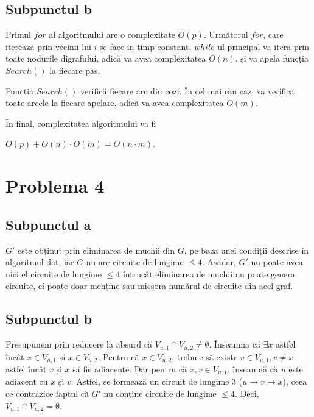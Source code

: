 \documentclass{article}
\begin{document}
\subsection*{\fontsize{16}{30}\selectfont Subpunctul b}
{\fontsize{14}{16}\selectfont
Primul $for$ al algoritmului are o complexitate $O(p)$. Următorul $for$, care itereaza prin vecinii lui $i$ se face in timp constant. $while$-ul principal va itera prin toate nodurile digrafului, adică va avea complexitatea $O(n)$, și va apela funcția $Search()$ la fiecare pas.

Functia $Search()$ verifică fiecare arc din cozi. În cel mai rău caz, va verifica toate arcele la fiecare apelare, adică va avea complexitatea $O(m)$.

În final, complexitatea algoritmului va fi \\
\centerline {$O(p) + O(n) \cdot O(m) = O(n \cdot m)$.}
}

\section*{\fontsize{20}{50}\selectfont Problema 4}

\subsection*{\fontsize{16}{30}\selectfont Subpunctul a}
{\fontsize{14}{16}\selectfont
\par $G'$ este obținut prin eliminarea de muchii din $G$, pe baza unei condiții descrise în algoritmul dat, iar $G$ nu are circuite de lungime $\le 4$. Așadar, $G'$ nu poate avea nici el circuite de lungime $\le 4$ întrucât eliminarea de muchii nu poate genera circuite, ci poate doar menține sau micșora numărul de circuite din acel graf.}

\subsection*{\fontsize{16}{30}\selectfont Subpunctul b}
{\fontsize{14}{16}\selectfont
\par Presupunem prin reducere la absurd că $V_{u,1} \cap V_{u,2} \neq \emptyset$. Înseamna că $\exists x$ astfel încât $x \in V_{u,1}$ și $x \in V_{u,2}$. Pentru că $x \in V_{u,2}$, trebuie să existe $v \in V_{u,1}, v \ne x$ astfel încât $v$ și $x$ să fie adiacente. Dar pentru că $x,v \in V_{u,1}$, înseamnă că $u$ este adiacent cu $x$ și $v$. Astfel, se formează un circuit de lungime 3 ($u \rightarrow v \rightarrow x$), ceea ce contrazice faptul că $G'$ nu conține circuite de lungime $\le 4$. Deci, $V_{u,1} \cap V_{u,2} = \emptyset$.}
\end{document}
